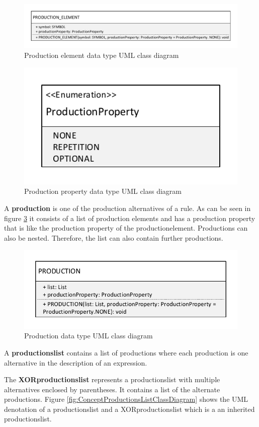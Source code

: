 \begin{figure}[H]
\centering
\includegraphics[width=.8\textwidth]{images/Concept_uml_data_types_production_element.pdf}
\caption{Production element data type UML class diagram}
\label{fig:ConceptProductionElementClassDiagram}
\end{figure}

\begin{figure}[H]
\centering
\includegraphics[width=.4\textwidth]{images/Concept_uml_data_types_production_property.pdf}
\caption{Production property data type UML class diagram}
\label{fig:ConceptProductionPropertyClassDiagram}
\end{figure}

A \textbf{production} is one of the production alternatives of a rule.
As can be seen in figure \ref{fig:ConceptProductionClassDiagram} it consists of a list of production elements and has a production property that is like the production property of the production\textunderscore element. Productions can also be nested.
Therefore, the list can also contain further productions. 

\begin{figure}[H]
\centering
\includegraphics[width=.5\textwidth]{images/Concept_uml_data_types_production.pdf}
\caption{Production data type UML class diagram}
\label{fig:ConceptProductionClassDiagram}
\end{figure}

A \textbf{productions\textunderscore list} contains a list of productions where each production is one alternative in the description of an expression. 

The \textbf{XOR\textunderscore productions\textunderscore list} represents a productions\textunderscore list with multiple alternatives enclosed by parentheses. It contains a list of the alternate productions. Figure \ref{fig:ConceptProductionsListClassDiagram} shows the UML denotation of a productions\textunderscore list and a XOR\textunderscore productions\textunderscore list which is a an inherited productions\textunderscore list.

